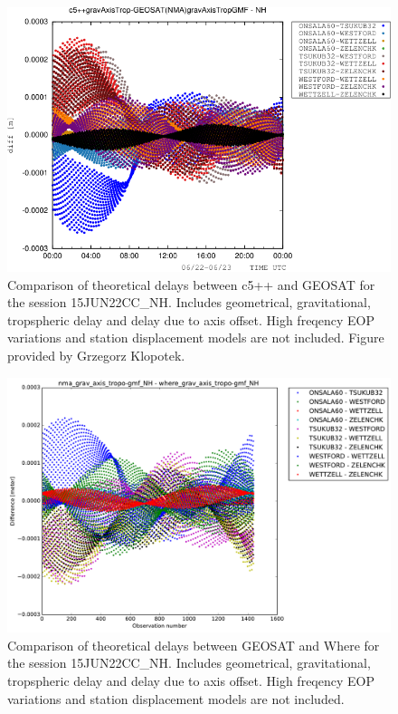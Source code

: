 \documentclass[twocolumn,twoside]{svmultivs_br} %
\begin{document}
\begin{figure}[htb!]
\centering
\includegraphics[width=\linewidth]{acnma01.pdf}
\caption{Comparison of theoretical delays between c5++ and GEOSAT for the session 15JUN22CC\_NH. Includes geometrical, gravitational, tropspheric delay and delay due to axis offset. High freqency EOP variations and station displacement models are not included. Figure provided by Grzegorz Klopotek.}
\label{fig:c5++vsgeosat}
\end{figure}

\begin{figure}[htb!]
\centering
\includegraphics[width=\linewidth]{acnma02.pdf}
\caption{Comparison of theoretical delays between GEOSAT and Where for the session 15JUN22CC\_NH. Includes geometrical, gravitational, tropspheric delay and delay due to axis offset. High freqency EOP variations and station displacement models are not included.}
\label{fig:geosatvswhere}
\end{figure}
\end{document}
